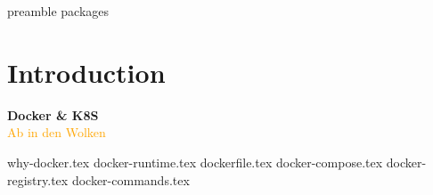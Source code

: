 \RequirePackage{import}
{preamble}
{packages}


\section{Introduction}\label{sec:introduction}

\begin{frame}[c]
    \centering
    \Huge
    \textbf{Docker \& K8S}
    \\
    \vspace{1ex}
    \Large
    \textcolor{orange}{Ab in den Wolken}
\end{frame}
{why-docker.tex}
{docker-runtime.tex}
{dockerfile.tex}
{docker-compose.tex}
{docker-registry.tex}
{docker-commands.tex}


